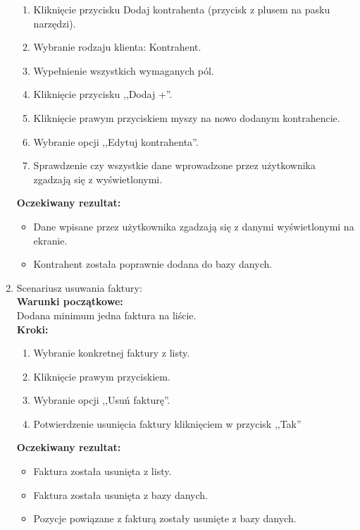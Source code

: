 \begin{enumerate}
\begin{enumerate}
            \item Kliknięcie przycisku Dodaj kontrahenta (przycisk z plusem na pasku narzędzi).
            \item Wybranie rodzaju klienta: Kontrahent.
            \item Wypełnienie wszystkich wymaganych pól.
            \item Kliknięcie przycisku ,,Dodaj +''.
            \item Kliknięcie prawym przyciskiem myszy na nowo dodanym kontrahencie.
            \item Wybranie opcji ,,Edytuj kontrahenta''.
            \item Sprawdzenie czy wszystkie dane wprowadzone przez użytkownika zgadzają się z wyświetlonymi.
        \end{enumerate}
        \textbf{Oczekiwany rezultat:}
        \begin{itemize}
            \item Dane wpisane przez użytkownika zgadzają się z danymi wyświetlonymi na ekranie.
            \item Kontrahent została poprawnie dodana do bazy danych.
        \end{itemize}
    \item Scenariusz usuwania faktury: \\
        \textbf{Warunki początkowe: } \\
        Dodana minimum jedna faktura na liście.\\
        \textbf{Kroki: }
        \begin{enumerate}
            \item Wybranie konkretnej faktury z listy.
            \item Kliknięcie prawym przyciskiem.
            \item Wybranie opcji ,,Usuń fakturę''.
            \item Potwierdzenie usunięcia faktury kliknięciem w przycisk ,,Tak''
        \end{enumerate}
        \textbf{Oczekiwany rezultat:}
        \begin{itemize}
            \item Faktura została usunięta z listy.
            \item Faktura została usunięta z bazy danych.
            \item Pozycje powiązane z fakturą zostały usunięte z bazy danych.
        \end{itemize}
\end{enumerate}
